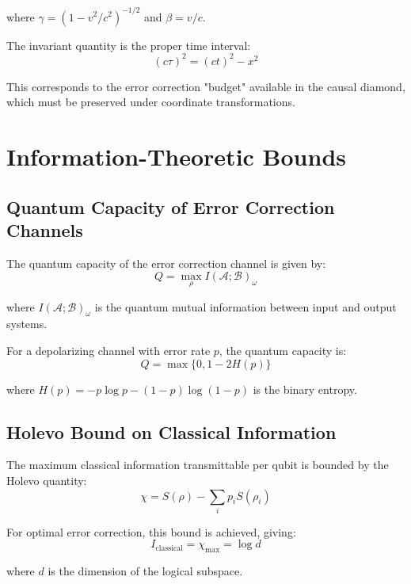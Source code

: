 \documentclass[12pt]{article}
\begin{document}
where $\gamma = (1-v^2/c^2)^{-1/2}$ and $\beta = v/c$.

The invariant quantity is the proper time interval:
\begin{equation}
(c\tau)^2 = (ct)^2 - x^2
\end{equation}

This corresponds to the error correction "budget" available in the causal diamond, which must be preserved under coordinate transformations.

\section{Information-Theoretic Bounds}

\subsection{Quantum Capacity of Error Correction Channels}

The quantum capacity of the error correction channel is given by:
\begin{equation}
Q = \max_{\rho} I(\mathcal{A};\mathcal{B})_\omega
\end{equation}

where $I(\mathcal{A};\mathcal{B})_\omega$ is the quantum mutual information between input and output systems.

For a depolarizing channel with error rate $p$, the quantum capacity is:
\begin{equation}
Q = \max\{0, 1 - 2H(p)\}
\end{equation}

where $H(p) = -p\log p - (1-p)\log(1-p)$ is the binary entropy.

\subsection{Holevo Bound on Classical Information}

The maximum classical information transmittable per qubit is bounded by the Holevo quantity:
\begin{equation}
\chi = S(\rho) - \sum_i p_i S(\rho_i)
\end{equation}

For optimal error correction, this bound is achieved, giving:
\begin{equation}
I_{\text{classical}} = \chi_{\max} = \log d
\end{equation}

where $d$ is the dimension of the logical subspace.
\end{document}
